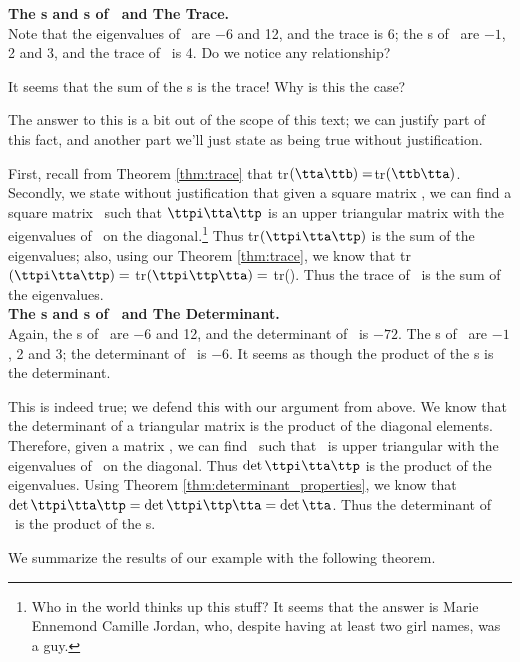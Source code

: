 \noindent \textsf{\textbf{The \el s and \ev s of \tta\ and The Trace.}}\\

Note that the eigenvalues of \tta\ are $-6$ and 12, and the trace is 6; the \el s of \ttb\ are $-1$, 2 and 3, and the trace of \ttb\ is 4. Do we notice any relationship? 

It seems that the sum of the \el s is the trace! Why is this the case?

The answer to this is a bit out of the scope of this text; we can justify part of this fact, and another part we'll just state as being true without justification. 

First, recall from Theorem \ref{thm:trace} that tr$(\tta\ttb) = $tr$(\ttb\tta)$. Secondly, we state without justification that given a square matrix \tta, we can find a square matrix \ttp\ such that $\ttpi\tta\ttp$ is an upper triangular matrix with the eigenvalues of \tta\ on the diagonal.\footnote{Who in the world thinks up this stuff? It seems that the answer is Marie Ennemond Camille Jordan, who, despite having at least two girl names, was a guy.} Thus tr$(\ttpi\tta\ttp)$ is the sum of the eigenvalues; also, using our Theorem \ref{thm:trace}, we know that tr$(\ttpi\tta\ttp) = $ tr$(\ttpi\ttp\tta) = $ tr(\tta). Thus the trace of \tta\ is the sum of the eigenvalues.\\

\noindent \textsf{\textbf{The \el s and \ev s of \tta\ and The Determinant.}}\\

Again, the \el s of \tta\ are $-6$ and 12, and the determinant of \tta\ is 
$-72$. The \el s of \ttb\ are $-1$, 2 and 3; the determinant of \ttb\ is $-6$. It seems as though the product of the \el s is the determinant.

This is indeed true; we defend this with our argument from above. We know that the determinant of a triangular matrix is the product of the diagonal elements. Therefore, given a matrix \tta, we can find \ttp\ such that \ttpi\tta\ttp\ is upper triangular with the eigenvalues of \tta\ on the diagonal. Thus $\det{\ttpi\tta\ttp}$ is the product of the eigenvalues. Using Theorem \ref{thm:determinant_properties}, we know that $\det{\ttpi\tta\ttp} = \det{\ttpi\ttp\tta} = \det{\tta}$. Thus the determinant of \tta\ is the product of the \el s.

We summarize the results of our example with the following theorem.

\smallskip

